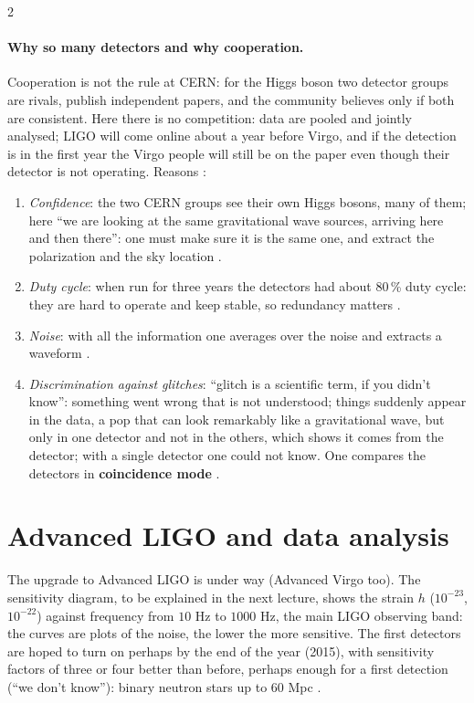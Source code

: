 \begin{paracol}{2}
\paragraph{Why so many detectors and why cooperation.} Cooperation is not the rule at CERN: for the Higgs boson two detector groups are rivals, publish independent papers, and the community believes only if both are consistent. Here there is no competition: data are pooled and jointly analysed; LIGO will come online about a year before Virgo, and if the detection is in the first year the Virgo people will still be on the paper even though their detector is not operating. Reasons :
\begin{enumerate}
  \item \emph{Confidence}: the two CERN groups see their own Higgs bosons, many of them; here ``we are looking at the same gravitational wave sources, arriving here and then there'': one must make sure it is the same one, and extract the polarization and the sky location .
  \item \emph{Duty cycle}: when run for three years the detectors had about 80\,\% duty cycle: they are hard to operate and keep stable, so redundancy matters .
  \item \emph{Noise}: with all the information one averages over the noise and extracts a waveform .
  \item \emph{Discrimination against glitches}: ``glitch is a scientific term, if you didn't know'': something went wrong that is not understood; things suddenly appear in the data, a pop that can look remarkably like a gravitational wave, but only in one detector and not in the others, which shows it comes from the detector; with a single detector one could not know. One compares the detectors in \textbf{coincidence mode} .
\end{enumerate}

\section{Advanced LIGO and data analysis}\label{sec:c27-adligo}

The upgrade to Advanced LIGO is under way (Advanced Virgo too). The sensitivity diagram, to be explained in the next lecture, shows the strain $h$ ($10^{-23}$, $10^{-22}$) against frequency from $10$ Hz to $1000$ Hz, the main LIGO observing band: the curves are plots of the noise, the lower the more sensitive. The first detectors are hoped to turn on perhaps by the end of the year (2015), with sensitivity factors of three or four better than before, perhaps enough for a first detection (``we don't know''): binary neutron stars up to $60$ Mpc .


\end{paracol}
